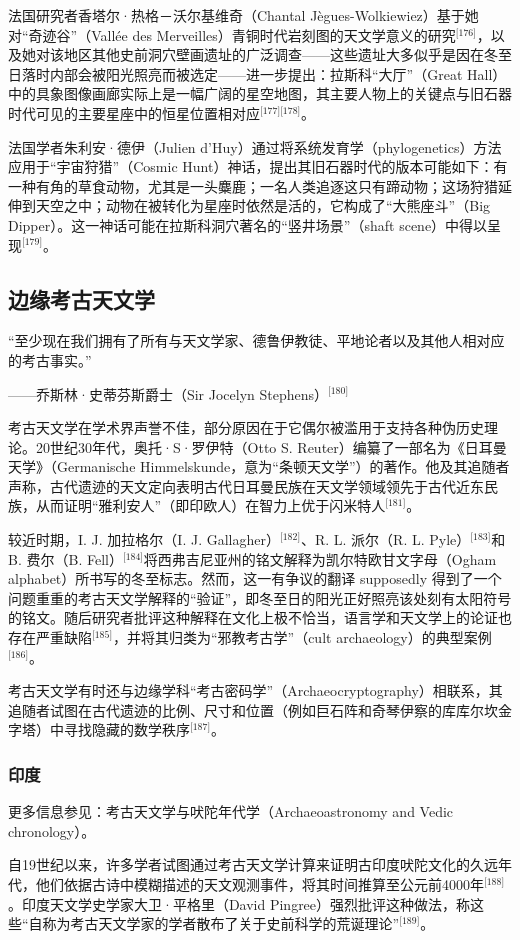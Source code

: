 法国研究者香塔尔·热格－沃尔基维奇（Chantal Jègues-Wolkiewiez）基于她对“奇迹谷”（Vallée des Merveilles）青铜时代岩刻图的天文学意义的研究\(^\text{[176]}\)，以及她对该地区其他史前洞穴壁画遗址的广泛调查——这些遗址大多似乎是因在冬至日落时内部会被阳光照亮而被选定——进一步提出：拉斯科“大厅”（Great Hall）中的具象图像画廊实际上是一幅广阔的星空地图，其主要人物上的关键点与旧石器时代可见的主要星座中的恒星位置相对应\(^\text{[177][178]}\)。  

法国学者朱利安·德伊（Julien d'Huy）通过将系统发育学（phylogenetics）方法应用于“宇宙狩猎”（Cosmic Hunt）神话，提出其旧石器时代的版本可能如下：有一种有角的草食动物，尤其是一头麋鹿；一名人类追逐这只有蹄动物；这场狩猎延伸到天空之中；动物在被转化为星座时依然是活的，它构成了“大熊座斗”（Big Dipper）。这一神话可能在拉斯科洞穴著名的“竖井场景”（shaft scene）中得以呈现\(^\text{[179]}\)。
\subsection{边缘考古天文学}
“至少现在我们拥有了所有与天文学家、德鲁伊教徒、平地论者以及其他人相对应的考古事实。”  

——乔斯林·史蒂芬斯爵士（Sir Jocelyn Stephens）\(^\text{[180]}\)

考古天文学在学术界声誉不佳，部分原因在于它偶尔被滥用于支持各种伪历史理论。20世纪30年代，奥托·S·罗伊特（Otto S. Reuter）编纂了一部名为《日耳曼天学》（Germanische Himmelskunde，意为“条顿天文学”）的著作。他及其追随者声称，古代遗迹的天文定向表明古代日耳曼民族在天文学领域领先于古代近东民族，从而证明“雅利安人”（即印欧人）在智力上优于闪米特人\(^\text{[181]}\)。

较近时期，I. J. 加拉格尔（I. J. Gallagher）\(^\text{[182]}\)、R. L. 派尔（R. L. Pyle）\(^\text{[183]}\)和B. 费尔（B. Fell）\(^\text{[184]}\)将西弗吉尼亚州的铭文解释为凯尔特欧甘文字母（Ogham alphabet）所书写的冬至标志。然而，这一有争议的翻译 supposedly 得到了一个问题重重的考古天文学解释的“验证”，即冬至日的阳光正好照亮该处刻有太阳符号的铭文。随后研究者批评这种解释在文化上极不恰当，语言学和天文学上的论证也存在严重缺陷\(^\text{[185]}\)，并将其归类为“邪教考古学”（cult archaeology）的典型案例\(^\text{[186]}\)。

考古天文学有时还与边缘学科“考古密码学”（Archaeocryptography）相联系，其追随者试图在古代遗迹的比例、尺寸和位置（例如巨石阵和奇琴伊察的库库尔坎金字塔）中寻找隐藏的数学秩序\(^\text{[187]}\)。

\subsubsection{印度}
更多信息参见：考古天文学与吠陀年代学（Archaeoastronomy and Vedic chronology）。

自19世纪以来，许多学者试图通过考古天文学计算来证明古印度吠陀文化的久远年代，他们依据古诗中模糊描述的天文观测事件，将其时间推算至公元前4000年\(^\text{[188]}\)。印度天文学史学家大卫·平格里（David Pingree）强烈批评这种做法，称这些“自称为考古天文学家的学者散布了关于史前科学的荒诞理论”\(^\text{[189]}\)。

